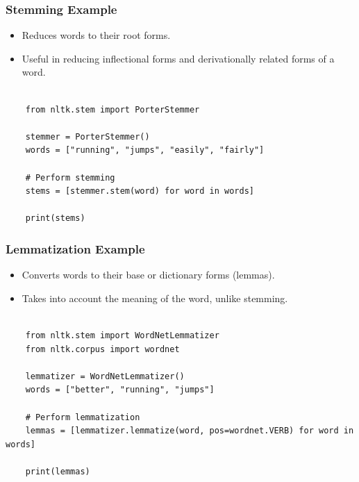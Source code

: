 \documentclass{beamer}
\begin{document}
\begin{frame}[fragile]
    \frametitle{Stemming Example}
    \begin{itemize}
        \item Reduces words to their root forms.
        \item Useful in reducing inflectional forms and derivationally related forms of a word.
    \end{itemize}
    \begin{lstlisting}[style=pythonStyle, caption=Stemming in Python with NLTK]

    from nltk.stem import PorterStemmer

    stemmer = PorterStemmer()
    words = ["running", "jumps", "easily", "fairly"]

    # Perform stemming
    stems = [stemmer.stem(word) for word in words]

    print(stems)
    \end{lstlisting}
\end{frame}

\begin{frame}[fragile]
    \frametitle{Lemmatization Example}
    \begin{itemize}
        \item Converts words to their base or dictionary forms (lemmas).
        \item Takes into account the meaning of the word, unlike stemming.
    \end{itemize}
    \begin{lstlisting}[style=pythonStyle, caption=Lemmatization in Python with NLTK]

    from nltk.stem import WordNetLemmatizer
    from nltk.corpus import wordnet

    lemmatizer = WordNetLemmatizer()
    words = ["better", "running", "jumps"]

    # Perform lemmatization
    lemmas = [lemmatizer.lemmatize(word, pos=wordnet.VERB) for word in words]

    print(lemmas)
    \end{lstlisting}
\end{frame}
\end{document}
